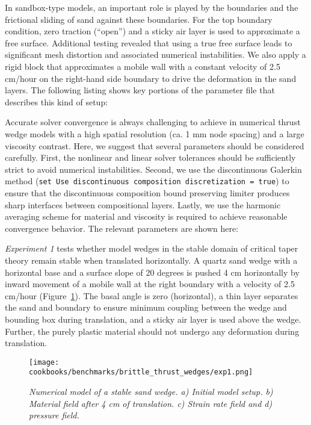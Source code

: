 \documentclass{article}
\begin{document}
In sandbox-type models, an important role is played by the boundaries and the 
frictional sliding of sand against these boundaries. For the top boundary condition, 
zero traction (``open'') and a sticky air layer is used to approximate a free surface. 
Additional testing revealed that using a true free surface leads to significant 
mesh distortion and associated numerical instabilities. We also apply a rigid block 
that approximates a mobile wall with a constant velocity of 2.5 cm/hour on the 
right-hand side boundary to drive the deformation in the sand layers. The following 
listing shows key portions of the parameter file that describes this kind of setup:



Accurate solver convergence is always challenging to achieve in numerical thrust 
wedge models with a high spatial resolution (ca. 1 mm node spacing) and a large 
viscosity contrast. Here, we suggest that several parameters should be considered 
carefully. First, the nonlinear and linear solver tolerances should be sufficiently 
strict to avoid numerical instabilities. Second, we use the discontinuous Galerkin 
method (\texttt{set Use discontinuous composition discretization = true}) to ensure 
that the discontinuous composition bound preserving limiter produces sharp interfaces 
between compositional layers. Lastly, we use the harmonic averaging scheme for 
material and viscosity is required to achieve reasonable convergence behavior. The 
relevant parameters are shown here:



\textit{Experiment 1} tests whether model wedges in the stable domain of critical 
taper theory remain stable when translated horizontally. A quartz sand wedge with 
a horizontal base and a surface slope of 20 degrees is pushed 4 cm horizontally by 
inward movement of a mobile wall at the right boundary with a velocity of 2.5 cm/hour 
(Figure~\ref{fig:btwexp1}). The basal angle is zero (horizontal), a thin layer separates 
the sand and boundary to ensure minimum coupling between the wedge and bounding box 
during translation, and a sticky air layer is used above the wedge. Further, the purely 
plastic material should not undergo any deformation during translation.

\begin{figure}
\begin{center}
  \centering
  \texttt{[image: cookbooks/benchmarks/brittle\_thrust\_wedges/exp1.png]}
  \caption{\it Numerical model of a stable sand wedge. a) Initial model setup. b) Material field after 4 cm of translation. c) Strain rate field and d) pressure field.}
  \label{fig:btwexp1}
\end{center}
\end{figure}
\end{document}
